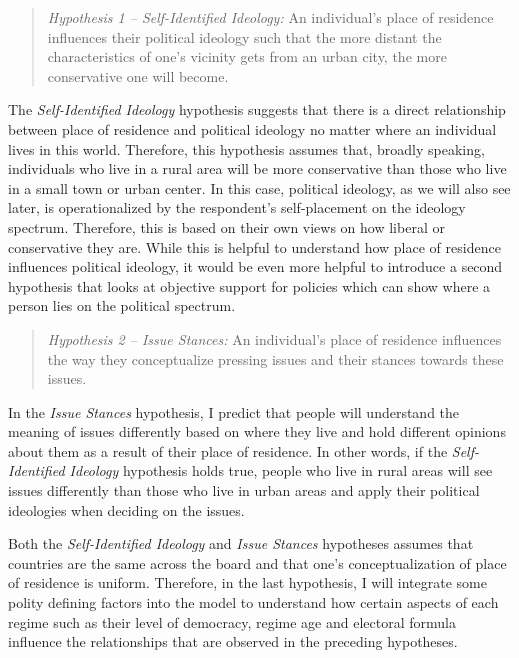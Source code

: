 \documentclass[12pt, titlepage]{article}
\newcommand\e{\emph}
\begin{document}
\begin{quote}
	\e {Hypothesis 1 -- Self-Identified Ideology:} An individual's place of residence influences their political ideology such that the more distant the characteristics of one's vicinity gets from an urban city, the more conservative one will become.
\end{quote}

The \e{Self-Identified Ideology} hypothesis suggests that there is a direct relationship between place of residence and political ideology no matter where an individual lives in this world. Therefore, this hypothesis assumes that, broadly speaking, individuals who live in a rural area will be more conservative than those who live in a small town or urban center. In this case, political ideology, as we will also see later, is operationalized by the respondent's self-placement on the ideology spectrum. Therefore, this is based on their own views on how liberal or conservative they are. While this is helpful to understand how place of residence influences political ideology, it would be even more helpful to introduce a second hypothesis that looks at objective support for policies which can show where a person lies on the political spectrum.

\begin{quote}
	\e{Hypothesis 2 -- Issue Stances:} An individual's place of residence influences the way they conceptualize pressing issues and their stances towards these issues.
\end{quote}

In the \e{Issue Stances} hypothesis, I predict that people will understand the meaning of issues differently based on where they live and hold different opinions about them as a result of their place of residence. In other words, if the \e{Self-Identified Ideology} hypothesis holds true, people who live in rural areas will see issues differently than those who live in urban areas and apply their political ideologies when deciding on the issues. 

Both the \e{Self-Identified Ideology} and \e{Issue Stances} hypotheses assumes that countries are the same across the board and that one's conceptualization of place of residence is uniform. Therefore, in the last hypothesis, I will integrate some polity defining factors into the model to understand how certain aspects of each regime such as their level of democracy, regime age and electoral formula influence the relationships that are observed in the preceding hypotheses. 
\end{document}
